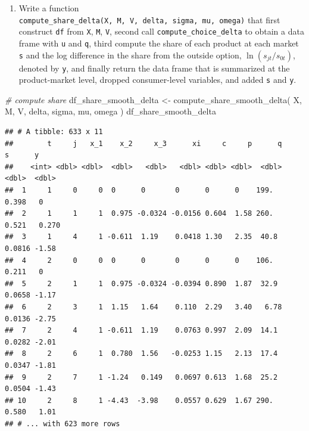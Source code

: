 \documentclass[
]{book}
\newenvironment{Shaded}{\begin{snugshade}}{\end{snugshade}}
\newcommand{\CommentTok}[1]{\textcolor[rgb]{0.56,0.35,0.01}{\textit{#1}}}
\newcommand{\FunctionTok}[1]{\textcolor[rgb]{0.00,0.00,0.00}{#1}}
\newcommand{\NormalTok}[1]{#1}
\newcommand{\OtherTok}[1]{\textcolor[rgb]{0.56,0.35,0.01}{#1}}
\providecommand{\tightlist}{%
  \setlength{\itemsep}{0pt}\setlength{\parskip}{0pt}}
\begin{document}
\begin{enumerate}
\def\labelenumi{\arabic{enumi}.}
\setcounter{enumi}{6}
\tightlist
\item
  Write a function \texttt{compute\_share\_delta(X,\ M,\ V,\ delta,\ sigma,\ mu,\ omega)} that first construct \texttt{df} from \texttt{X}, \texttt{M}, \texttt{V}, second call \texttt{compute\_choice\_delta} to obtain a data frame with \texttt{u} and \texttt{q}, third compute the share of each product at each market \texttt{s} and the log difference in the share from the outside option, \(\ln(s_{jt}/s_{0t})\), denoted by \texttt{y}, and finally return the data frame that is summarized at the product-market level, dropped consumer-level variables, and added \texttt{s} and \texttt{y}.
\end{enumerate}

\begin{Shaded}
\begin{Highlighting}[]
\CommentTok{\# compute share}
\NormalTok{df\_share\_smooth\_delta }\OtherTok{\textless{}{-}}
  \FunctionTok{compute\_share\_smooth\_delta}\NormalTok{(}
\NormalTok{    X, }
\NormalTok{    M, }
\NormalTok{    V, }
\NormalTok{    delta, }
\NormalTok{    sigma, }
\NormalTok{    mu, }
\NormalTok{    omega}
\NormalTok{    ) }
\NormalTok{df\_share\_smooth\_delta}
\end{Highlighting}
\end{Shaded}

\begin{verbatim}
## # A tibble: 633 x 11
##        t     j   x_1    x_2     x_3      xi     c     p      q      s      y
##    <int> <dbl> <dbl>  <dbl>   <dbl>   <dbl> <dbl> <dbl>  <dbl>  <dbl>  <dbl>
##  1     1     0     0  0      0       0      0      0    199.   0.398   0    
##  2     1     1     1  0.975 -0.0324 -0.0156 0.604  1.58 260.   0.521   0.270
##  3     1     4     1 -0.611  1.19    0.0418 1.30   2.35  40.8  0.0816 -1.58 
##  4     2     0     0  0      0       0      0      0    106.   0.211   0    
##  5     2     1     1  0.975 -0.0324 -0.0394 0.890  1.87  32.9  0.0658 -1.17 
##  6     2     3     1  1.15   1.64    0.110  2.29   3.40   6.78 0.0136 -2.75 
##  7     2     4     1 -0.611  1.19    0.0763 0.997  2.09  14.1  0.0282 -2.01 
##  8     2     6     1  0.780  1.56   -0.0253 1.15   2.13  17.4  0.0347 -1.81 
##  9     2     7     1 -1.24   0.149   0.0697 0.613  1.68  25.2  0.0504 -1.43 
## 10     2     8     1 -4.43  -3.98    0.0557 0.629  1.67 290.   0.580   1.01 
## # ... with 623 more rows
\end{verbatim}
\end{document}

